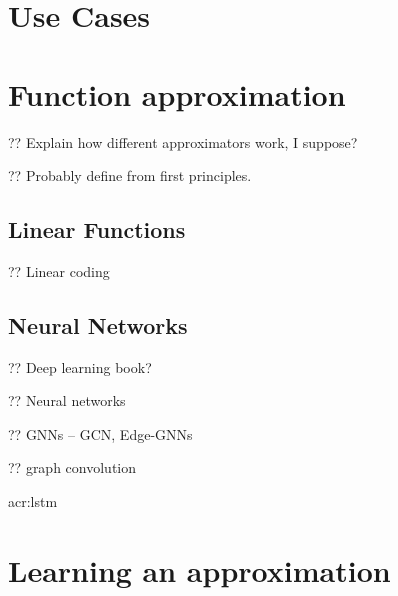 \section{Use Cases}\label{sec:use-cases}%


\section{Function approximation}\label{sec:function-approximation}

?? Explain how different approximators work, I suppose?

?? Probably  define from first principles.
%
%

\subsection{Linear Functions}

?? Linear coding

\subsection{Neural Networks}

?? Deep learning book?~\cite{DBLP:books/daglib/0040158}

?? Neural networks

?? GNNs -- GCN, Edge-GNNs~\parencite{Mirhoseini2021}

?? graph convolution~\parencite{DBLP:conf/iclr/KipfW17}

\gls{acr:lstm}~\parencite{DBLP:journals/neco/HochreiterS97}

\section{Learning an approximation}\label{sec:learning-an-approximation}%




